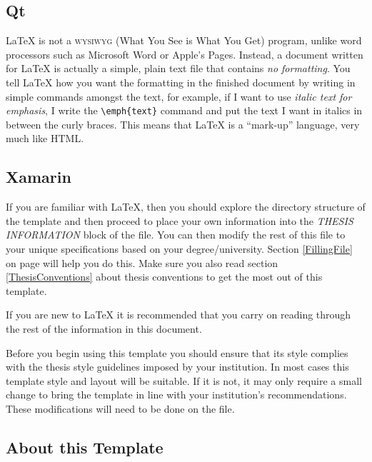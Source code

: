 \subsection{Qt}

\LaTeX{} is not a \textsc{wysiwyg} (What You See is What You Get) program, unlike word processors such as Microsoft Word or Apple's Pages. Instead, a document written for \LaTeX{} is actually a simple, plain text file that contains \emph{no formatting}. You tell \LaTeX{} how you want the formatting in the finished document by writing in simple commands amongst the text, for example, if I want to use \emph{italic text for emphasis}, I write the \verb|\emph{text}| command and put the text I want in italics in between the curly braces. This means that \LaTeX{} is a \enquote{mark-up} language, very much like HTML.

\subsection{Xamarin}

If you are familiar with \LaTeX{}, then you should explore the directory structure of the template and then proceed to place your own information into the \emph{THESIS INFORMATION} block of the  file. You can then modify the rest of this file to your unique specifications based on your degree/university. Section \ref{FillingFile} on page \pageref{FillingFile} will help you do this. Make sure you also read section \ref{ThesisConventions} about thesis conventions to get the most out of this template.

If you are new to \LaTeX{} it is recommended that you carry on reading through the rest of the information in this document.

Before you begin using this template you should ensure that its style complies with the thesis style guidelines imposed by your institution. In most cases this template style and layout will be suitable. If it is not, it may only require a small change to bring the template in line with your institution's recommendations. These modifications will need to be done on the  file.

\subsection{About this Template}

